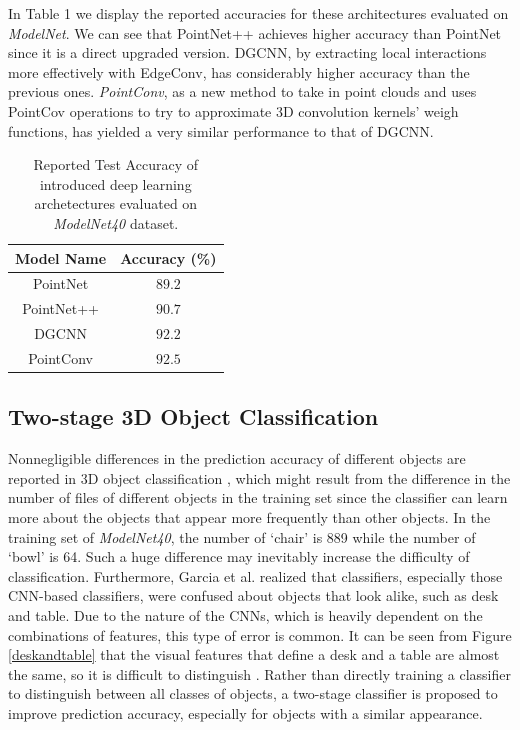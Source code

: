 \documentclass{article}
\begin{document}
In Table 1 we display the reported accuracies for these architectures evaluated on \textit{ModelNet}. We can see that PointNet++ achieves higher accuracy than PointNet since it is a direct upgraded version. DGCNN, by extracting local interactions more effectively with EdgeConv, has considerably higher accuracy than the previous ones. \textit{PointConv}, as a new method to take in point clouds and uses PointCov operations to try to approximate 3D convolution kernels' weigh functions, has yielded a very similar performance to that of DGCNN.

\begin{table}[!h]
  \centering
  \small
  \caption{Reported Test Accuracy of introduced deep learning archetectures evaluated on \textit{ModelNet40} dataset.}
  \label{tbl::com}
  \begin{tabular}{cc}
    \toprule
    Model Name & Accuracy (\%) \\
    \midrule
    PointNet & $89.2$\\
    PointNet++ & $90.7$\\
    DGCNN & $92.2$\\
    PointConv & $92.5$\\
    \bottomrule
  \end{tabular}
\end{table}

\subsection{Two-stage 3D Object Classification}

Nonnegligible differences in the prediction accuracy of different objects are reported in 3D object classification \cite{ben20173d,garcia2016pointnet, kd, pointnet}, which might result from the difference in the number of files of different objects in the training set since the classifier can learn more about the objects that appear more frequently than other objects. In the training set of \textit{ModelNet40}\cite{modelnet}, the number of `chair' is 889 while the number of `bowl' is 64. Such a huge difference may inevitably increase the difficulty of classification. Furthermore, Garcia et al. \cite{garcia2016pointnet} realized that classifiers, especially those CNN-based classifiers, were confused about objects that look alike, such as desk and table. Due to the nature of the CNNs, which is heavily dependent on the combinations of features, this type of error is common\cite{garcia2016pointnet}. It can be seen from Figure \ref{deskandtable} that the visual features that define a desk and a table are almost the same, so it is difficult to distinguish \cite {garcia2016pointnet}. Rather than directly training a classifier to distinguish between all classes of objects, a two-stage classifier is proposed to improve prediction accuracy, especially for objects with a similar appearance.
\end{document}
